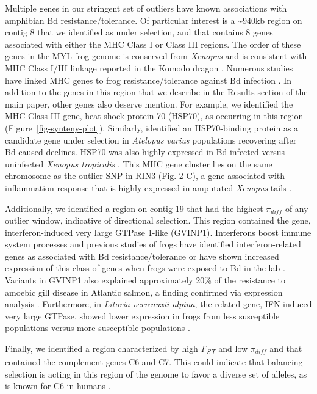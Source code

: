 \documentclass[9pt,twoside,lineno]{pnas-new}
\begin{document}
Multiple genes in our stringent set of outliers have known associations
with amphibian Bd resistance/tolerance. Of particular interest is a
\textasciitilde940kb region on contig 8 that we identified as under
selection, and that contains 8 genes associated with either the MHC
Class I or Class III regions. The order of these genes in the MYL frog
genome is conserved from \emph{Xenopus} \citep{ohta2006} and is
consistent with MHC Class I/III linkage reported in the Komodo dragon
\citep{reed2021}. Numerous studies have linked MHC genes to frog
resistance/tolerance against Bd infection
\citep[e.g.,][]{savage2011, bataille2015}. In addition to the genes in
this region that we describe in the Results section of the main paper,
other genes also deserve mention. For example, we identified the MHC
Class III gene, heat shock protein 70 (HSP70), as occurring in this
region (Figure~\ref{fig-synteny-plot}). Similarly, \citep{byrne2020}
identified an HSP70-binding protein as a candidate gene under selection
in \emph{Atelopus varius} populations recovering after Bd-caused
declines. HSP70 was also highly expressed in Bd-infected versus
uninfected \emph{Xenopus tropicalis} \citep{rosenblum2009}. This MHC
gene cluster lies on the same chromosome as the outlier SNP in RIN3
(Fig. 2 C), a gene associated with
inflammation response that is highly expressed in amputated
\emph{Xenopus} tails \citep{fukazawa2009}.

Additionally, we identified a region on contig 19 that had the highest
\(\pi_{diff}\) of any outlier window, indicative of directional
selection. This region contained the gene, interferon-induced very large
GTPase 1-like (GVINP1). Interferons boost immune system processes and
previous studies of frogs have identified interferon-related genes as
associated with Bd resistance/tolerance \citep{byrne2020} or have shown
increased expression of this class of genes when frogs were exposed to
Bd in the lab \citep{rosenblum2009, ellison2014}. Variants in GVINP1
also explained approximately 20\% of the resistance to amoebic gill
disease in Atlantic salmon, a finding confirmed via expression analysis
\citep{robledo2018, robledo2020}. Furthermore, in \emph{Litoria
verreauxii alpina}, the related gene, IFN-induced very large GTPase,
showed lower expression in frogs from less susceptible populations
versus more susceptible populations \citep{grogan2018}.

Finally, we identified a region characterized by high
\emph{F\textsubscript{ST}} and low \(\pi_{diff}\) and that contained the
complement genes C6 and C7. This could indicate that balancing selection
is acting in this region of the genome to favor a diverse set of
alleles, as is known for C6 in humans \citep{soejima2005}.
\end{document}

